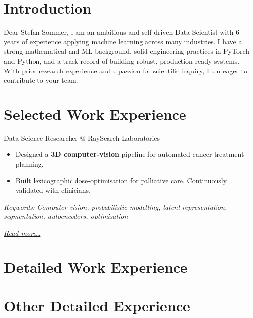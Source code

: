 \documentclass[11pt,a4paper]{moderncv}
\begin{document}
\makecvtitle

\section*{Introduction}
Dear Stefan Sommer, I am an ambitious and self-driven Data Scientist with 6 years of experience applying machine learning across many industries. I have a strong mathematical and ML background, solid engineering practices in PyTorch and Python, and a track record of building robust, production-ready systems. With prior research experience and a passion for scientific inquiry, I am eager to contribute to your team.



\section{Selected Work Experience}
\large{Data Science Researcher @ RaySearch Laboratories}

\normalsize
\begin{itemize}
    \item Designed a \textbf{3D computer-vision} pipeline for automated cancer treatment planning.
    \item Built lexicographic dose-optimisation for palliative care. Continuously validated with clinicians.
\end{itemize}

{\footnotesize\textit{Keywords: Computer vision, probabilistic modelling, latent representation, segmentation, autoencoders, optimisation}}

\hfill{\small{\textit{\hyperref[sec:raysearch]{Read more…}}}}







\newpage
\section{Detailed Work Experience}





\section{Other Detailed Experience}

\end{document}
